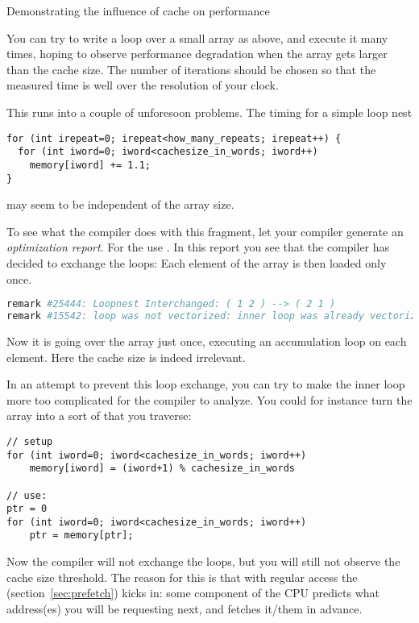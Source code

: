  {Demonstrating the influence of cache on performance}

You can try to write a loop over a small array as above, and
execute it many times,
hoping to observe performance degradation when the
array gets larger than the cache size.
The number of iterations should be chosen so that the measured time
is well over the resolution of your clock.

This runs into a couple of unforesoon problems.
The timing for a simple loop nest
\begin{lstlisting}
for (int irepeat=0; irepeat<how_many_repeats; irepeat++) {
  for (int iword=0; iword<cachesize_in_words; iword++)
    memory[iword] += 1.1;
}    
\end{lstlisting}
may seem to be independent of the array size.

To see what the compiler does with this fragment,
let your compiler generate an
\emph{optimization report}.
For the  use .
In this report you see that the compiler has decided to exchange the loops:
Each element of the array is then loaded only once.
\begin{lstlisting}[language=Bash]
remark #25444: Loopnest Interchanged: ( 1 2 ) --> ( 2 1 )
remark #15542: loop was not vectorized: inner loop was already vectorized
\end{lstlisting}
Now it is going over the array just once, executing an accumulation loop
on each element. Here the cache size is indeed irrelevant.

In an attempt to prevent this loop exchange,
you can try to make the inner loop more too complicated
for the compiler to analyze.
You could for instance turn the array into a sort of 
that you traverse:
\begin{lstlisting}
// setup
for (int iword=0; iword<cachesize_in_words; iword++)
    memory[iword] = (iword+1) % cachesize_in_words

// use:
ptr = 0
for (int iword=0; iword<cachesize_in_words; iword++)
    ptr = memory[ptr];
\end{lstlisting}
Now the compiler will not exchange the loops, but you will still not
observe the cache size threshold.
The reason for this is that with regular access the 
(section~\ref{sec:prefetch}) kicks in:
some component of the CPU predicts what address(es) you will be requesting next,
and fetches it/them in advance.

